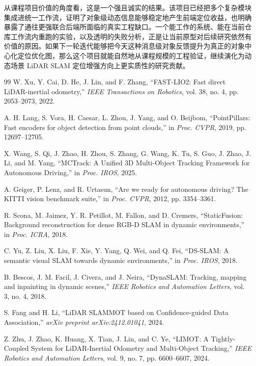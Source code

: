 \documentclass[utf8, a4paper, 12pt]{ctexart}
\begin{document}
从课程项目价值的角度看，这是一个强且诚实的结果。该项目已经把多个复杂模块集成进统一工作流，证明了对象级动态信息能够稳定地产生前端定位收益，也明确暴露了通往更强联合后端所面临的真实工程缺口。一个能工作的系统、能在当前仓库工作流内重跑的实验，以及透明的失败分析，正是让当前原型对后续研究依然有价值的原因。如果下一轮迭代能够把今天这种消息级对象反馈提升为真正的对象中心化定位优化图，那么这个项目就能自然地从课程规模的工程验证，继续演化为动态场景 LiDAR SLAM 定位增强方向上更实质性的研究贡献。
\clearpage
{}
\begin{thebibliography}{99}
W. Xu, Y. Cai, D. He, J. Lin, and F. Zhang, ``FAST-LIO2: Fast direct LiDAR-inertial odometry,'' \emph{IEEE Transactions on Robotics}, vol. 38, no. 4, pp. 2053--2073, 2022.

A. H. Lang, S. Vora, H. Caesar, L. Zhou, J. Yang, and O. Beijbom, ``PointPillars: Fast encoders for object detection from point clouds,'' in \emph{Proc. CVPR}, 2019, pp. 12697--12705.

X. Wang, S. Qi, J. Zhao, H. Zhou, S. Zhang, G. Wang, K. Tu, S. Guo, J. Zhao, J. Li, and M. Yang, ``MCTrack: A Unified 3D Multi-Object Tracking Framework for Autonomous Driving,'' in \emph{Proc. IROS}, 2025.

A. Geiger, P. Lenz, and R. Urtasun, ``Are we ready for autonomous driving? The KITTI vision benchmark suite,'' in \emph{Proc. CVPR}, 2012, pp. 3354--3361.

R. Scona, M. Jaimez, Y. R. Petillot, M. Fallon, and D. Cremers, ``StaticFusion: Background reconstruction for dense RGB-D SLAM in dynamic environments,'' in \emph{Proc. ICRA}, 2018.

C. Yu, Z. Liu, X. Liu, F. Xie, Y. Yang, Q. Wei, and Q. Fei, ``DS-SLAM: A semantic visual SLAM towards dynamic environments,'' in \emph{Proc. IROS}, 2018.

B. Bescos, J. M. Facil, J. Civera, and J. Neira, ``DynaSLAM: Tracking, mapping and inpainting in dynamic scenes,'' \emph{IEEE Robotics and Automation Letters}, vol. 3, no. 4, 2018.

S. Fang and H. Li, ``LiDAR SLAMMOT based on Confidence-guided Data Association,'' \emph{arXiv preprint arXiv:2412.01041}, 2024.

Z. Zhu, J. Zhao, K. Huang, X. Tian, J. Lin, and C. Ye, ``LIMOT: A Tightly-Coupled System for LiDAR-Inertial Odometry and Multi-Object Tracking,'' \emph{IEEE Robotics and Automation Letters}, vol. 9, no. 7, pp. 6600--6607, 2024.


\end{thebibliography}
\end{document}
